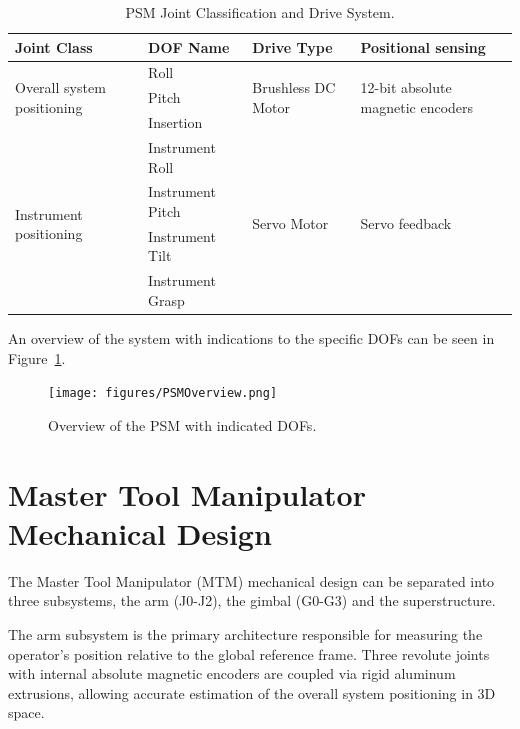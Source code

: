 \begin{table}[H]
    \caption{PSM Joint Classification and Drive System.}
    \label{tab:psm_dofs}
    \setlength{\tabcolsep}{4pt} %
    \begin{tabular}{|p{3.0cm}|l|l|p{4.5cm}|} %
    \hline
    \textbf{Joint Class} & \textbf{DOF Name} & \textbf{Drive Type} & \textbf{Positional sensing} \\
    \hline
    \multirow{3}{3.0cm}{\raggedright Overall system positioning} & Roll & \multirow{3}{*}{Brushless DC Motor} & \multirow{3}{4.5cm}{\raggedright 12-bit absolute magnetic encoders} \\
    & Pitch & & \\
    & Insertion & & \\
    \hline
    \multirow{4}{3.0cm}{\raggedright Instrument positioning} & Instrument Roll & \multirow{4}{*}{Servo Motor} & \multirow{4}{4.5cm}{\raggedright Servo feedback} \\
    & Instrument Pitch & & \\
    & Instrument Tilt & & \\
    & Instrument Grasp & & \\
    \hline
    \end{tabular}
\end{table}


An overview of the system with indications to the specific DOFs can be seen in Figure~\ref{fig:psm_overview}.

\begin{figure}[H] %
    \centering
    \texttt{[image: figures/PSMOverview.png]} 
    \caption{Overview of the PSM with indicated DOFs.}
    \label{fig:psm_overview}
\end{figure}

\section{Master Tool Manipulator Mechanical Design}

The Master Tool Manipulator (MTM) mechanical design can be separated into three subsystems, the arm (J0-J2), the gimbal (G0-G3) and the superstructure.

The arm subsystem is the primary architecture responsible for measuring the operator's position relative to the global reference frame. Three revolute joints with internal absolute magnetic encoders are coupled via rigid aluminum extrusions, allowing accurate estimation of the overall system positioning in 3D space.


